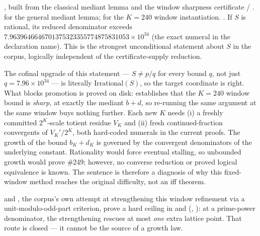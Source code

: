 \begin{thm}
,
built from the classical mediant lemma  and the window
sharpness certificate 
/ .  for the general
mediant lemma;  for the $K=240$ window instantiation. . If $S$ is rational,
its reduced denominator exceeds $7.9639646646701375323355774875831053\times 10^{34}$ (the exact
numeral in the declaration name). This is the strongest unconditional statement about $S$ in the
corpus, logically independent of the certificate-supply reduction.
\end{thm}

\begin{rem}
The cofinal upgrade of this statement --- $S\ne p/q$ for every bound $q$, not just $q =
7.96\times10^{34}$ --- is literally $\mathrm{Irrational}(S)$, so the target coordinate is right.
What blocks promotion is proved on disk:
 establishes that the $K=240$
window bound is \emph{sharp}, at exactly the mediant $b{+}d$, so re-running the same argument at
the same window buys nothing further. Each new $K$ needs (i) a freshly committed $2^K$-scale
totient residue $V_K$ and (ii) fresh continued-fraction convergents of $V_K'/2^K$, both hard-coded
numerals in the current proofs. The growth of the bound $b_K{+}d_K$ is governed by the convergent
denominators of the underlying constant.  Rationality would force eventual stalling, so unbounded
growth would prove \#249; however, no converse reduction or proved logical equivalence is known.
The sentence is therefore a diagnosis of why this fixed-window method reaches the original
difficulty, not an iff theorem.
\end{rem}

\begin{obs}
 and
, the corpus's
own attempt at strengthening this window refinement via a unit-modulo-odd-part criterion, prove a
hard ceiling in
 and
(, ): at a prime-power denominator, the strengthening rescues at most \emph{one}
extra lattice point. That route is closed --- it cannot be the source of a growth law.
\end{obs}

